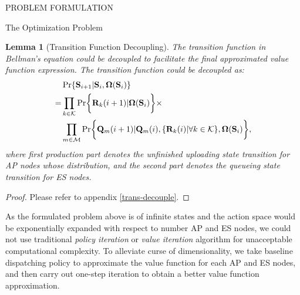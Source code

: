 \documentclass[10pt, conference, letterpaper]{IEEEtran}
\newtheorem{lemma}{Lemma}
\renewcommand{\vec}{\mathbf}
\DeclarePairedDelimiter{\set}{\{}{\}}
\DeclarePairedDelimiter{\Brace}{\bigg\{}{\bigg\}}
\newcommand{\apSet}{\mathcal{K}}
\newcommand{\esSet}{\mathcal{M}}
\newcommand{\Stat}{\mathbf{S}}
\newcommand{\Policy}{\mathbf{\Omega}}
\begin{document}
\begin{section}{PROBLEM FORMULATION}
\begin{subsection}{The Optimization Problem}
            \begin{lemma}[Transition Function Decoupling]
                The transition function in Bellman's equation could be decoupled to facilitate the final approximated value function expression. The transition function could be decoupled as:
                \begin{align}
                    & \Pr\{\Stat_{i+1}|\Stat_{i}, \Policy(\Stat_{i})\} 
                    \nonumber\\
                    =& \prod_{k\in\apSet} \Pr\Brace{\vec{R}_k(i+1)|\Policy(\Stat_{i})} \times
                        \nonumber\\
                        & \prod_{m\in\esSet}
                            \Pr \Brace{\vec{Q}_m(i+1)|\vec{Q}_m(i), \set{\vec{R}_k(i)|\forall k\in\apSet}, \Policy(\Stat_{i})},
                \end{align}
                where first production part denotes the unfinished uploading state transition for AP nodes whose distribution, and the second part denotes the queueing state transition for ES nodes.
            \end{lemma}
            \begin{proof}
                Please refer to appendix \ref{trans-decouple}.
            \end{proof}

            As the formulated problem above is of infinite states and the action space would be exponentially expanded with respect to number AP and ES nodes, we could not use traditional \emph{policy iteration} or \emph{value iteration} algorithm \cite{sutton1998introduction} for unacceptable computational complexity. To alleviate curse of dimensionality, we take baseline dispatching policy to approximate the value function for each AP and ES nodes, and then carry out one-step iteration to obtain a better value function approximation.
        \end{subsection}
    \end{section}
\end{document}

